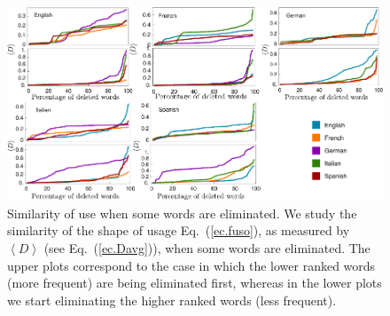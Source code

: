 \documentclass[10pt,letterpaper]{article} %
\newcommand{\eref}[1]{Eq.~(\ref{#1})}
\begin{document}
% 

\begin{figure}[!h]
	\begin{adjustwidth}{-2.5cm}{1cm}
		\centering
		\includegraphics{images/dsFinal}
		\caption{{Similarity of use when some words are eliminated.}
We study the similarity of the shape of usage \eref{ec.fuso}, as measured by
$\left\langle D \right\rangle $ (see \eref{ec.Davg}), when some words are eliminated.
The upper plots correspond to the case in which the lower ranked words (more frequent) are being
eliminated first, whereas in the lower plots we start eliminating the higher ranked
words (less frequent). 
}
		\label{fig.RP}
	\end{adjustwidth}
\end{figure}
\end{document}
